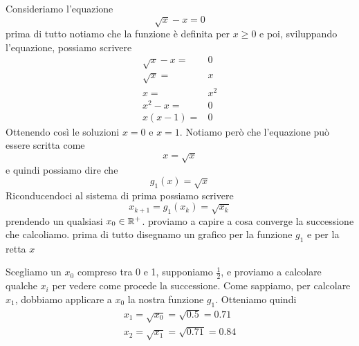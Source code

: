 \begin{example}
	Consideriamo l'equazione
	\[ \sqrt{x} - x = 0 \]
	prima di tutto notiamo che la funzione è definita per $x \geq 0$ e poi, sviluppando l'equazione, possiamo
	scrivere
	\begin{align*}
		\sqrt{x} - x = & 0   \\
		\sqrt{x} =     & x   \\
		x =            & x^2 \\
		x^2 - x =      & 0   \\
		x (x - 1) =    & 0
	\end{align*}
	Ottenendo così le soluzioni $x = 0$ e $x = 1$. Notiamo però che l'equazione può essere scritta come
	\[ x = \sqrt{x} \]
	e quindi possiamo dire che
	\[ g_1(x) = \sqrt{x} \]
	Riconducendoci al sistema di prima possiamo scrivere
	\[ x_{k+1} = g_1(x_k) = \sqrt{x_k} \]
	prendendo un qualsiasi $x_0 \in \mathbb{R}^+$. proviamo a capire a cosa converge la successione che calcoliamo.
	prima di tutto disegnamo un grafico per la funzione $g_1$ e per la retta $x$
	\begin{center}
	\end{center}
	Scegliamo un $x_0$ compreso tra 0 e 1, supponiamo $\frac{1}{2}$, e proviamo a calcolare qualche $x_i$ per
	vedere come procede la successione. Come sappiamo, per calcolare $x_1$, dobbiamo applicare a $x_0$ la nostra
	funzione $g_1$. Otteniamo quindi
	\begin{gather*}
		x_1 = \sqrt{x_0} = \sqrt{0.5} = 0.71 \\
		x_2 = \sqrt{x_1} = \sqrt{0.71} = 0.84
	\end{gather*}


\end{example}

